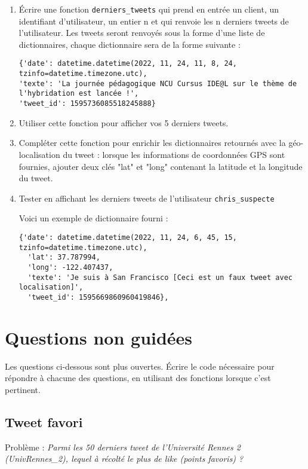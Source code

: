 \documentclass[11pt,a4paper]{article}
\begin{document}
\begin{enumerate}
\item Écrire une fonction \verb+derniers_tweets+ qui prend en entrée un client, un identifiant d'utilisateur, un entier n et qui renvoie les n derniers tweets de l'utilisateur. 
Les tweets seront renvoyés sous la forme d'une liste de dictionnaires, chaque dictionnaire sera de la forme suivante : 
\begin{verbatim}
{'date': datetime.datetime(2022, 11, 24, 11, 8, 24, tzinfo=datetime.timezone.utc),
'texte': 'La journée pédagogique NCU Cursus IDE@L sur le thème de l'hybridation est lancée !',
'tweet_id': 1595736085518245888}
\end{verbatim}
\item Utiliser cette fonction pour afficher vos 5 derniers tweets.

\item Compléter cette fonction pour enrichir les dictionnaires retournés avec la géo-localisation du tweet : lorsque les informations de coordonnées GPS sont fournies, ajouter deux clés "lat" et "long" contenant la latitude et la longitude du tweet.
\item Tester en affichant les derniers tweets de l'utilisateur \verb+chris_suspecte+

Voici un exemple de dictionnaire fourni : 
\begin{verbatim}
{'date': datetime.datetime(2022, 11, 24, 6, 45, 15, tzinfo=datetime.timezone.utc),
  'lat': 37.787994,
  'long': -122.407437,
  'texte': 'Je suis à San Francisco [Ceci est un faux tweet avec localisation]',
  'tweet_id': 1595669860960419846},
\end{verbatim}

\end{enumerate}


\section{Questions non guidées}

Les questions ci-dessous sont plus ouvertes. Écrire le code nécessaire pour répondre à chacune des questions, en utilisant des fonctions lorsque c'est pertinent.

\subsection{Tweet favori}

Problème :
\emph{Parmi les 50 derniers tweet de l'Université Rennes 2 (UnivRennes\_2), lequel à récolté le plus de like (points favoris) ? }
\\
\end{document}
